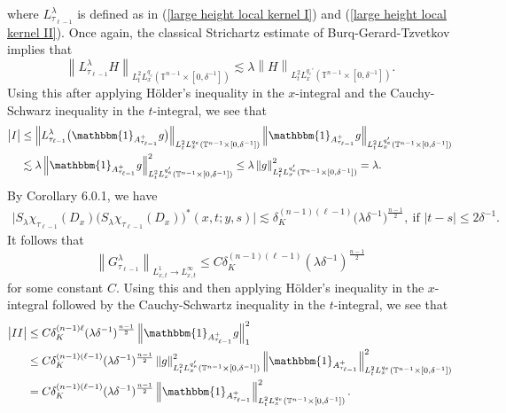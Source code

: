 \documentclass[11pt]{amsart}
\numberwithin{equation}{section}
\newcommand{\Tn}{\mathbb{T}^{n-1}}
\newcommand{\la}{\lambda}
\newcommand\norm[1]{\left\lVert#1\right\rVert}
\newcommand{\altlpnorm}[2]{\norm{#1}_{#2}}
\newcommand{\mixlpnorm}[4]{\norm{#1}_{L^{#2}_{t} L^{#3}_{x}(#4)}}
\newcommand{\Lpopnormalt}[5]{\norm{#1}_{L^{#2}_{#3} \to L^{#4}_{#5} }}
\newcommand{\Sl}{S_{\la}}
\begin{document}
where $L_{\tau_{\ell -1}}^{\la}$ is defined as in (\ref{large height local kernel I}) and (\ref{large height local kernel II}).
Once again, the classical Strichartz estimate of Burq-Gerard-Tzvetkov \cite{bgtstrichartzmanifold} implies that
\begin{equation}
    \mixlpnorm{L_{\tau_{\ell -1}}^{\la}H}{2}{q_e}{\Tn \times [0,\delta^{-1}]} \lesssim \la \mixlpnorm{H}{2}{q_e'}{\Tn \times [0,\delta^{-1}]}.
\end{equation}
Using this after applying H\"{o}lder's inequality in the $x$-integral and the Cauchy-Schwarz inequality in the $t$-integral, we see that 
\begin{equation} \label{endpoint large height 1st term estimate}
    \begin{split}
        \big| I \big| &\leq \mixlpnorm{L_{\tau_{\ell - 1}}^{\la}\big( \mathbbm{1}_{A^{+}_{\tau_{\ell - 1}}}g\big)}{2}{q_e}{\Tn \times [0,\delta^{-1}]}  \mixlpnorm{\mathbbm{1}_{A^{+}_{\tau_{\ell - 1}}}g}{2}{q_e'}{\Tn \times [0,\delta^{-1}]} \\
        &\lesssim \la \mixlpnorm{\mathbbm{1}_{A^{+}_{\tau_{\ell - 1}}}g}{2}{q_e'}{\Tn \times [0,\delta^{-1}]}^2 \leq \la\mixlpnorm{g}{2}{q_e'}{\Tn \times [0,\delta^{-1}]}^2 = \la.
    \end{split}
\end{equation}
By Corollary 6.0.1, we have
\begin{equation} \label{endpoint kernel estimate for large heights}
\begin{split}
    \big| \Sl \chi_{\tau_{\ell - 1}}(D_x) \big(\Sl \chi_{\tau_{\ell - 1}}(D_x)\big)^*(x,t;y,s) \big|  \lesssim \delta_{K}^{(n-1)(\ell-1)} \big(\la \delta^{-1}\big)^{\frac{n-1}{2}}, \ \text{if } |t-s| \leq 2\delta^{-1}.
\end{split}
\end{equation}
It follows that 
\begin{equation}
    \Lpopnormalt{G_{\tau_{\ell - 1}}^{\la}}{1}{x,t}{\infty}{x,t} \leq C\delta_{K}^{(n-1)(\ell - 1)}(\la \delta^{-1})^{\frac{n-1}{2}}
\end{equation}
for some constant $C$. Using this and then applying H\"{o}lder's inequality in the $x$-integral followed by the Cauchy-Schwartz inequality in the $t$-integral, we see that
\begin{equation}
\begin{split}
    \big| II \big| &\leq C\delta_{K}^{(n-1)\ell}(\la \delta^{-1})^{\frac{n-1}{2}} \altlpnorm{\mathbbm{1}_{A^{+}_{\tau_{\ell - 1}}}g}{1}^2 \\
    &\leq C\delta_{K}^{(n-1)(\ell-1)}(\la \delta^{-1})^{\frac{n-1}{2}}\mixlpnorm{g}{2}{q_e'}{\Tn \times [0,\delta^{-1}]}^{2} \mixlpnorm{\mathbbm{1}_{A^{+}_{\tau_{\ell - 1}}}}{2}{q_e}{\Tn \times [0,\delta^{-1}]}^2 \\
    &= C\delta_{K}^{(n-1)(\ell-1)}(\la \delta^{-1})^{\frac{n-1}{2}}\mixlpnorm{\mathbbm{1}_{A^{+}_{\tau_{\ell - 1}}}}{2}{q_e}{\Tn \times [0,\delta^{-1}]}^2.
\end{split}
\end{equation}
\end{document}
